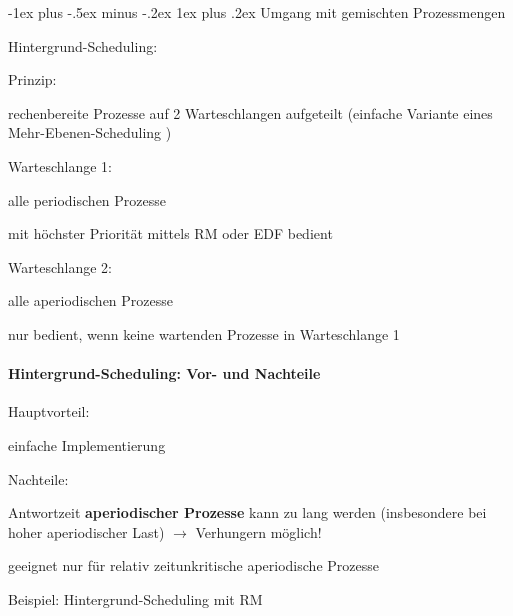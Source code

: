 \documentclass[a4paper]{article}
\makeatletter
\renewcommand{\subsubsection}{\@startsection{subsubsection}{3}{0mm}%
 {-1ex plus -.5ex minus -.2ex}%
 {1ex plus .2ex}%
 {\normalfont\small\bfseries}}
\makeatother
\begin{document}
\begin{multicols}{3}
    \subsubsection{Umgang mit gemischten
        Prozessmengen}

    \begin{itemize*}
        \item Hintergrund-Scheduling:
        \begin{itemize*}
            \item Prinzip: %
            \item rechenbereite Prozesse auf 2 Warteschlangen aufgeteilt (einfache Variante eines Mehr-Ebenen-Scheduling )
            \item Warteschlange 1: \begin{itemize*} \item alle periodischen Prozesse \item mit höchster Priorität mittels RM oder EDF bedient \end{itemize*}
            \item Warteschlange 2: \begin{itemize*} \item alle aperiodischen Prozesse \item nur bedient, wenn keine wartenden Prozesse in Warteschlange 1 \end{itemize*}
        \end{itemize*}
    \end{itemize*}


    \paragraph{Hintergrund-Scheduling: Vor- und
        Nachteile}

    \begin{itemize*}
        \item Hauptvorteil:
        \begin{itemize*}
            \item einfache Implementierung
        \end{itemize*}
        \item Nachteile:
        \begin{itemize*}
            \item Antwortzeit \textbf{aperiodischer Prozesse} kann zu lang werden (insbesondere bei hoher aperiodischer Last) $\rightarrow$ Verhungern möglich!
            \item geeignet nur für relativ zeitunkritische aperiodische Prozesse
        \end{itemize*}
        \item Beispiel: Hintergrund-Scheduling mit RM
    \end{itemize*}



\end{multicols}
\end{document}
